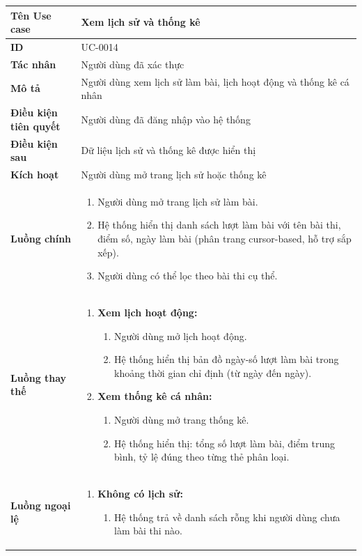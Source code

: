 {
\renewcommand{\arraystretch}{1.5}

\begin{tabularx}{\textwidth}{|>{\raggedright\arraybackslash}X|>{\raggedright\arraybackslash}X|}
\hline
\textbf{Tên Use case} & Xem lịch sử và thống kê \\
\hline
\textbf{ID} & UC-0014 \\
\hline
\textbf{Tác nhân} & Người dùng đã xác thực \\
\hline
\textbf{Mô tả} & Người dùng xem lịch sử làm bài, lịch hoạt động và thống kê cá nhân \\
\hline
\textbf{Điều kiện tiên quyết} & Người dùng đã đăng nhập vào hệ thống \\
\hline
\textbf{Điều kiện sau} & Dữ liệu lịch sử và thống kê được hiển thị \\
\hline
\textbf{Kích hoạt} & Người dùng mở trang lịch sử hoặc thống kê \\
\hline
\textbf{Luồng chính} &
\begin{enumerate}
    \item Người dùng mở trang lịch sử làm bài.
    \item Hệ thống hiển thị danh sách lượt làm bài với tên bài thi, điểm số, ngày làm bài (phân trang cursor-based, hỗ trợ sắp xếp).
    \item Người dùng có thể lọc theo bài thi cụ thể.
\end{enumerate} \\
\hline
\textbf{Luồng thay thế} &
\begin{enumerate}
    \item \textbf{Xem lịch hoạt động:}
    \begin{enumerate}
        \item[1A.] Người dùng mở lịch hoạt động.
        \item[2A.] Hệ thống hiển thị bản đồ ngày-số lượt làm bài trong khoảng thời gian chỉ định (từ ngày đến ngày).
    \end{enumerate}
    \item \textbf{Xem thống kê cá nhân:}
    \begin{enumerate}
        \item[1B.] Người dùng mở trang thống kê.
        \item[2B.] Hệ thống hiển thị: tổng số lượt làm bài, điểm trung bình, tỷ lệ đúng theo từng thẻ phân loại.
    \end{enumerate}
\end{enumerate} \\
\hline
\textbf{Luồng ngoại lệ} &
\begin{enumerate}
    \item \textbf{Không có lịch sử:}
    \begin{enumerate}
        \item[2Err.] Hệ thống trả về danh sách rỗng khi người dùng chưa làm bài thi nào.
    \end{enumerate}
\end{enumerate} \\
\hline
\end{tabularx}
}
